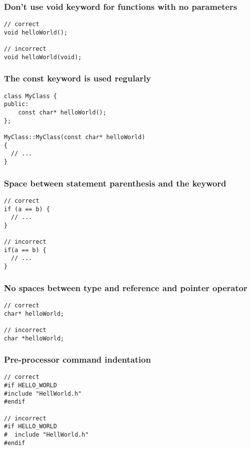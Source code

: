 \subsubsection{Don't use void keyword for functions with no parameters}

\begin{verbatim}
// correct
void helloWorld();

// incorrect
void helloWorld(void);
\end{verbatim}

\subsubsection{The const keyword is used regularly}

\begin{verbatim}
class MyClass {
public:
    const char* helloWorld();
};

MyClass::MyClass(const char* helloWorld)
{
  // ...
}
\end{verbatim}

\subsubsection{Space between statement parenthesis and the keyword}

\begin{verbatim}
// correct
if (a == b) {
  // ...
}

// incorrect
if(a == b) {
  // ...
}
\end{verbatim}

\subsubsection{No spaces between type and reference and pointer operator}

\begin{verbatim}
// correct
char* helloWorld;

// incorrect
char *helloWorld;
\end{verbatim}

\subsubsection{Pre-processor command indentation}

\begin{verbatim}
// correct
#if HELLO_WORLD
#include "HellWorld.h"
#endif

// incorrect
#if HELLO_WORLD
#  include "HellWorld.h"
#endif
\end{verbatim}

